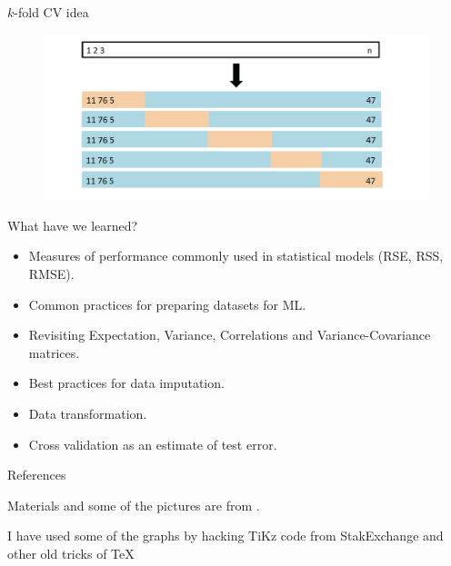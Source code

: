 \documentclass{beamer}
\begin{document}
\begin{frame}{$k$-fold CV idea}
	\begin{figure}
		\centering
		\includegraphics[scale=0.35]{../../Figures/fig_kfoldcv.png}
	\end{figure}	
\end{frame}

\begin{frame}{What have we learned?}
	\begin{itemize}
		\item Measures of performance commonly used in statistical models (RSE, RSS, RMSE).
		\item Common practices for preparing datasets for ML.
		\item Revisiting Expectation, Variance, Correlations and Variance-Covariance matrices.
		\item Best practices for data imputation.
		\item Data transformation.
		\item Cross validation as an estimate of test error. 
		
	\end{itemize}
\end{frame}


\begin{frame}{References}
	
\nocite{*}	
Materials and some of the pictures are from \citep{James2015}.
    \printbibliography 




I have used some of the graphs by hacking TiKz code from StakExchange and other old tricks of \TeX
\end{frame}		
\end{document}

